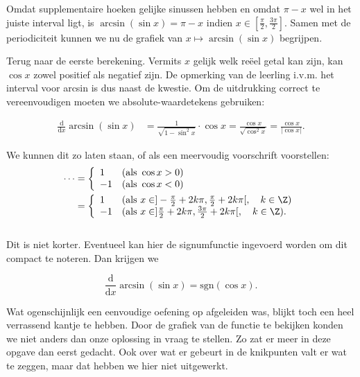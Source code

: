 Omdat supplementaire hoeken gelijke sinussen hebben en omdat $\pi - x$ wel in het juiste interval ligt, is $\arcsin (\sin x)= \pi - x$ indien $x \in [\frac{\pi}{2},\frac{3\pi}{2}]$. Samen met de periodiciteit kunnen we nu de grafiek van $x\mapsto \arcsin (\sin x) $ begrijpen.

Terug naar de eerste berekening. Vermits $x$ gelijk welk reëel getal kan zijn, kan $\cos x$ zowel positief als negatief zijn. De opmerking van de leerling i.v.m. het interval voor arcsin is dus naast de kwestie. Om de uitdrukking correct te vereenvoudigen moeten we absolute-waardetekens gebruiken:

\begin{align*}
    \frac{\mathrm{d}}{\mathrm{d}x} \arcsin (\sin x) &= \frac{1}{\sqrt{1-\sin^2 x}}\cdot \cos x =\frac{\cos x}{\sqrt{\cos^2 x}}= \frac{\cos x}{\lvert{\cos x}\rvert}.
\end{align*}

We kunnen dit zo laten staan, of als een meervoudig voorschrift voorstellen:
\begin{align*}
    \cdots &= \left\{ \begin{array}{ll}
         1 & (\text{als } \cos x > 0)\\
        -1 & (\text{als } \cos x < 0)\end{array} \right.\\
          &= \left\{ \begin{array}{ll}
         1 & (\text{als } x \in ]-\frac{\pi}{2} + 2k\pi, \frac{\pi}{2}+2k\pi[, \quad k \in \Z )\\
        -1 & (\text{als } x \in ]\frac{\pi}{2} + 2k\pi, \frac{3\pi}{2}+2k\pi[, \quad k \in \Z ).\end{array} \right.
\end{align*}\\

Dit is niet korter. Eventueel kan hier de signumfunctie ingevoerd worden om dit compact te noteren. Dan krijgen we 

\[\frac{\mathrm{d}}{\mathrm{d}x} \arcsin (\sin x) =  \text{sgn} (\cos x) .\]


Wat ogenschijnlijk een eenvoudige oefening op afgeleiden was, blijkt toch een heel verrassend kantje te hebben. Door de grafiek van de functie te bekijken konden we niet anders dan onze oplossing in vraag te stellen. Zo zat er meer in deze opgave dan eerst gedacht. Ook over wat er gebeurt in de knikpunten valt er wat te zeggen, maar dat hebben we hier niet uitgewerkt.



